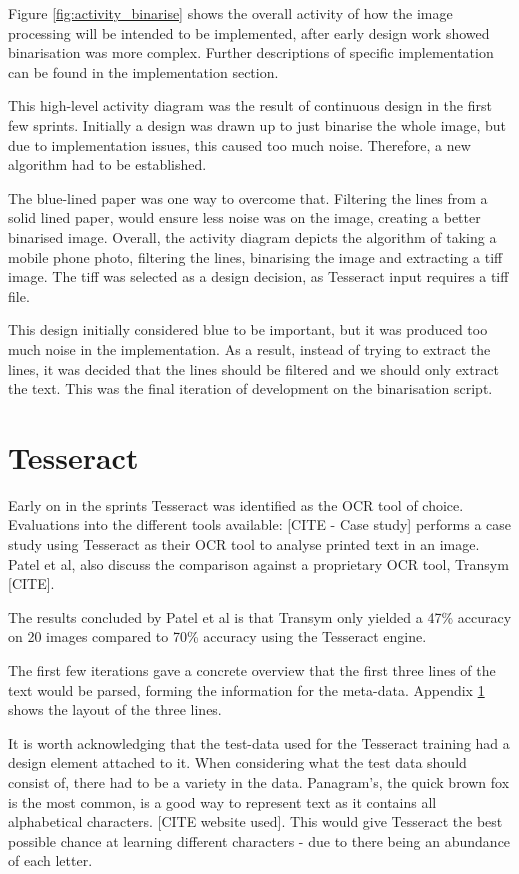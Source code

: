 Figure \ref{fig:activity_binarise} shows the overall activity of how the image processing will be intended to be implemented, after early design work showed binarisation was more complex. Further descriptions of specific implementation can be found in the implementation section.

This high-level activity diagram was the result of continuous design in the first few sprints. Initially a design was drawn up to just binarise the whole image, but due to implementation issues, this caused too much noise. Therefore, a new algorithm had to be established.

The blue-lined paper was one way to overcome that. Filtering the lines from a solid lined paper, would ensure less noise was on the image, creating a better binarised image. Overall, the activity diagram depicts the algorithm of taking a mobile phone photo, filtering the lines, binarising the image and extracting a tiff image. The tiff was selected as a design decision, as Tesseract input requires a tiff file.

This design initially considered blue to be important, but it was produced too much noise in the implementation. As a result, instead of trying to extract the lines, it was decided that the lines should be filtered and we should only extract the text. This was the final iteration of development on the binarisation script.

\section{Tesseract}
Early on in the sprints Tesseract was identified as the OCR tool of choice. Evaluations into the different tools available: [CITE - Case study] performs a case study using Tesseract as their OCR tool to analyse printed text in an image. Patel et al, also discuss the comparison against a proprietary OCR tool, Transym [CITE].

The results concluded by Patel et al is that Transym only yielded a 47\% accuracy on 20 images compared to 70\% accuracy using the Tesseract engine.

The first few iterations gave a concrete overview that the first three lines of the text would be parsed, forming the information for the meta-data. Appendix \ref{} shows the layout of the three lines.

It is worth acknowledging that the test-data used for the Tesseract training had a design element attached to it. When considering what the test data should consist of, there had to be a variety in the data. Panagram's, the quick brown fox is the most common, is a good way to represent text as it contains all alphabetical characters. [CITE website used]. This would give Tesseract the best possible chance at learning different characters - due to there being an abundance of each letter.

